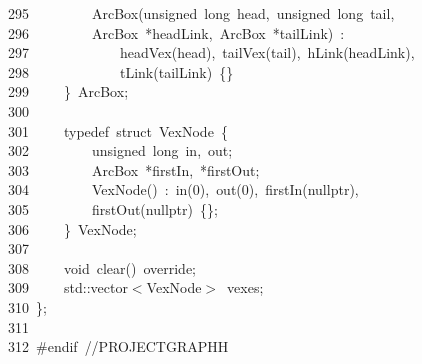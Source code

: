 \documentclass{ctexart}
\newcommand{\hlstd}[1]{\textcolor[rgb]{0.2,0.2,0.2}{#1}}
\newcommand{\hlnum}[1]{\textcolor[rgb]{0.06,0.58,0.63}{#1}}
\newcommand{\hlslc}[1]{\textcolor[rgb]{0.59,0.59,0.59}{#1}}
\newcommand{\hlppc}[1]{\textcolor[rgb]{0.41,0.78,0.23}{#1}}
\newcommand{\hlopt}[1]{\textcolor[rgb]{0.2,0.2,0.2}{#1}}
\newcommand{\hllin}[1]{\textcolor[rgb]{0.59,0.59,0.59}{#1}}
\newcommand{\hlkwb}[1]{\textcolor[rgb]{0.63,0,0.31}{#1}}
\newcommand{\hlkwc}[1]{\textcolor[rgb]{0,0.63,0.31}{#1}}
\newcommand{\hlkwd}[1]{\textcolor[rgb]{0.78,0.23,0.41}{#1}}
\begin{document}
\hllin{295\ }\hlstd{}\hlstd{\ \ \ \ \ \ \ \ }\hlstd{}\hlkwd{ArcBox}\hlstd{}\hlopt{(}\hlstd{}\hlkwb{unsigned\ long\ }\hlstd{head}\hlopt{,\ }\hlstd{}\hlkwb{unsigned\ long\ }\hlstd{tail}\hlopt{,\ }\Righttorque\\
\hllin{296\ }\hlstd{}\hlstd{\ \ \ \ \ \ \ \ }\hlstd{ArcBox\ }\hlopt{{*}}\hlstd{headLink}\hlopt{,\ }\hlstd{ArcBox\ }\hlopt{{*}}\hlstd{tailLink}\hlopt{)\ :}\\
\hllin{297\ }\hlstd{}\hlstd{\ \ \ \ \ \ \ \ \ \ \ \ }\hlstd{}\hlkwd{headVex}\hlstd{}\hlopt{(}\hlstd{head}\hlopt{),\ }\hlstd{}\hlkwd{tailVex}\hlstd{}\hlopt{(}\hlstd{tail}\hlopt{),\ }\hlstd{}\hlkwd{hLink}\hlstd{}\hlopt{(}\hlstd{headLink}\hlopt{),\ }\Righttorque\\
\hllin{298\ }\hlstd{}\hlstd{\ \ \ \ \ \ \ \ \ \ \ \ }\hlstd{}\hlkwd{tLink}\hlstd{}\hlopt{(}\hlstd{tailLink}\hlopt{)\ \{\}}\\
\hllin{299\ }\hlstd{}\hlstd{\ \ \ \ }\hlstd{}\hlopt{\}\ }\hlstd{ArcBox}\hlopt{;}\\
\hllin{300\ }\hlstd{}\\
\hllin{301\ }\hlstd{}\hlstd{\ \ \ \ }\hlstd{}\hlkwc{typedef\ }\hlstd{}\hlkwb{struct\ }\hlstd{VexNode\ }\hlopt{\{}\\
\hllin{302\ }\hlstd{}\hlstd{\ \ \ \ \ \ \ \ }\hlstd{}\hlkwb{unsigned\ long\ }\hlstd{in}\hlopt{,\ }\hlstd{out}\hlopt{;}\\
\hllin{303\ }\hlstd{}\hlstd{\ \ \ \ \ \ \ \ }\hlstd{ArcBox\ }\hlopt{{*}}\hlstd{firstIn}\hlopt{,\ {*}}\hlstd{firstOut}\hlopt{;}\\
\hllin{304\ }\hlstd{}\hlstd{\ \ \ \ \ \ \ \ }\hlstd{}\hlkwd{VexNode}\hlstd{}\hlopt{()\ :\ }\hlstd{}\hlkwd{in}\hlstd{}\hlopt{(}\hlstd{}\hlnum{0}\hlstd{}\hlopt{),\ }\hlstd{}\hlkwd{out}\hlstd{}\hlopt{(}\hlstd{}\hlnum{0}\hlstd{}\hlopt{),\ }\hlstd{}\hlkwd{firstIn}\hlstd{}\hlopt{(}\hlstd{}\hlkwc{nullptr}\hlstd{}\hlopt{),\ }\Righttorque\\
\hllin{305\ }\hlstd{}\hlstd{\ \ \ \ \ \ \ \ }\hlstd{}\hlkwd{firstOut}\hlstd{}\hlopt{(}\hlstd{}\hlkwc{nullptr}\hlstd{}\hlopt{)\ \{\};}\\
\hllin{306\ }\hlstd{}\hlstd{\ \ \ \ }\hlstd{}\hlopt{\}\ }\hlstd{VexNode}\hlopt{;}\\
\hllin{307\ }\hlstd{}\\
\hllin{308\ }\hlstd{}\hlstd{\ \ \ \ }\hlstd{}\hlkwb{void\ }\hlstd{}\hlkwd{clear}\hlstd{}\hlopt{()\ }\hlstd{override}\hlopt{;}\\
\hllin{309\ }\hlstd{}\hlstd{\ \ \ \ }\hlstd{}\hlkwc{std}\hlstd{}\hlopt{::}\hlstd{vector}\hlopt{$<$}\hlstd{VexNode}\hlopt{$>$\ }\hlstd{vexes}\hlopt{;}\\
\hllin{310\ }\hlstd{}\hlopt{\};}\\
\hllin{311\ }\hlstd{}\\
\hllin{312\ }\hlstd{}\hlppc{\#endif\ }\hlslc{//PROJECT\textunderscore GRAPH\textunderscore H}\hlppc{}\hlstd{}\\
\mbox{}
\normalfont
\normalsize
\end{document}
